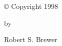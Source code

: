 
\newpage


\par\vspace*{2.5in}

\begin{center}

\copyright\/ Copyright 1998

by

Robert S. Brewer

\end{center}
